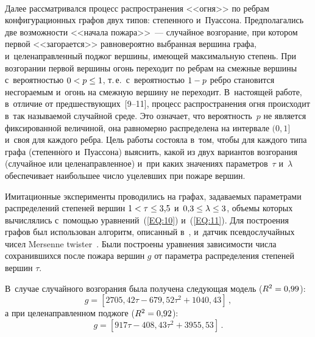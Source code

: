 \begin{multicols}{2}
\begin{figure*}[b] %
 \vspace*{7pt}
 \begin{center}
 \mbox{%
 \epsfxsize=159.045mm
 }
\end{center}
 \vspace*{-9pt}
\end{figure*}

Далее рассматривался процесс распространения <<огня>> по реб\-рам конфигурационных
графов двух типов: степенного и~Пуассона. Предполагались две возможности <<начала
пожара>>~--- случайное возгорание, при котором первой <<загорается>> равновероятно
выбранная вершина графа, и~це\-ле\-на\-прав\-лен\-ный поджог вершины, имеющей максимальную степень.
При возгорании первой вершины огонь переходит по реб\-рам на смежные вершины с~вероятностью
$0\hm<p\hm\leq 1$, т.\,е.\ с~вероятностью $1\hm-p$ реб\-ро становится несгораемым и~огонь на смежную
вершину не переходит. В~настоящей работе, в~отличие от
предшествующих~[9--11],
процесс распространения огня происходит в~так называемой случайной среде.
Это означает,
что вероятность~$p$ не является фиксированной величиной, она равномерно распределена на
интервале $(0,1]$ и~своя для каждого реб\-ра.
Цель работы состояла в~том, чтобы для каждого типа графа (степенн$\acute{\mbox{о}}$го
и~Пуассона) выяснить,
какой из двух вариантов возгорания (случайное или целенаправленное) и~при каких значениях
параметров~$\tau$ и~$\lambda$ обеспечивает наибольшее чис\-ло уцелевших при пожаре вершин.

Имитационные эксперименты проводились на графах, задаваемых параметрами распределений
степеней вершин $1\hm<\tau\hm\leq 3{,}5$ и~$0{,}3\hm\leq\lambda\hm\leq 3$,
объемы которых вы\-чис\-ля\-лись
с~по\-мощью уравнений~(\ref{EQ:10}) и~(\ref{EQ:11}). Для по\-стро\-ения графов был использован
алгоритм, описанный в~\cite{Tang}, и~датчик псевдослучайных чисел Mersenne
twister~\cite{MT}.
Были построены уравнения зависимости чис\-ла сохранившихся после пожара вершин $g$ от
параметра распределения степеней вершин $\tau$. 

В~случае случайного возгорания была получена
следующая модель ($R^2\hm=0{,}99$):
\begin{equation}
\label{EQ:6}
g = \left[2705{,}42\tau - 679{,}52\tau^2 + 1040{,}43\right]\,,
\end{equation}
а при целенаправленном поджоге ($R^2\hm=0{,}92$):
\begin{equation}
\label{EQ:7}
g = \left[917\tau - 408{,}43\tau^2 + 3955{,}53\right]\,.
\end{equation}


\end{multicols}
